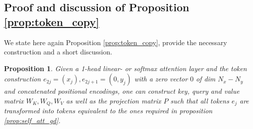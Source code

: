 \documentclass{article}
\newtheorem{prop}{Proposition}
\theoremstyle{plain}
\theoremstyle{definition}
\theoremstyle{remark}
\begin{document}
\subsection{Proof and discussion of Proposition  \ref{prop:token_copy}}
\label{app:prop2}
\setcounter{prop}{2}
We state here again Proposition \ref{prop:token_copy}, provide the necessary construction and a short discussion.
\begin{prop}
Given a 1-head linear- or softmax attention layer and the token construction $e_{2j} = (x_j), e_{2j+1} = (0, y_j)$ with a zero vector $0$ of dim $N_x -N_y$ and concatenated positional encodings, one can construct key, query and value matrix $W_K, W_Q, W_V$ as well as the projection matrix $P$ such that all tokens $e_j$ are transformed into tokens equivalent to the ones required in proposition \ref{prop:self_att_gd}. 
\end{prop}
\end{document}
